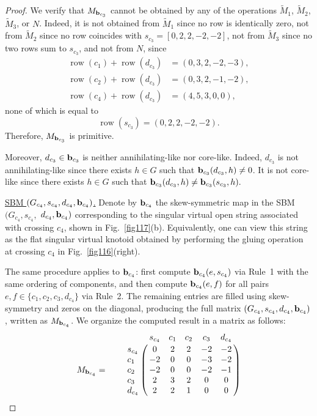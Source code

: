 \documentclass[12pt]{amsart}
\theoremstyle{noparens}
\numberwithin{equation}{section}
\numberwithin{equation}{section}
\begin{document}
\begin{proof}
	We verify that $M_{{\bf b}_{c_3}}$ cannot be obtained by any of the operations $\widetilde{M}_1$, $\widetilde{M}_2$, $\widetilde{M}_3$, or $N$. Indeed, it is not obtained from $\widetilde{M}_1$ since no row is identically zero, not from $\widetilde{M}_2$ since no row coincides with $s_{c_3} = [0, 2, 2, -2, -2]$, not from $\widetilde{M}_3$ since no two rows sum to $s_{c_3}$, and not from $N$, since
	\[
	\begin{aligned}
		\operatorname{row}(c_1)+\operatorname{row}(d_{c_3})
		&=(0,3,2,-2,-3),\\
		\operatorname{row}(c_2)+\operatorname{row}(d_{c_3})
		&=(0,3,2,-1,-2),\\
		\operatorname{row}(c_4)+\operatorname{row}(d_{c_3})
		&=(4,5,3,0,0),
	\end{aligned}
	\]
	none of which is equal to
	\[
	\operatorname{row}(s_{c_3})=(0,2,2,-2,-2).
	\]
	Therefore, $M_{{\bf b}_{c_3}}$ is primitive.
	
	Moreover, $d_{c_3} \in {\bf b}_{c_3}$ is neither annihilating-like nor core-like. Indeed, $d_{c_3}$ is not annihilating-like since there exists $h \in G$ such that ${\bf b}_{c_3}(d_{c_3},h) \neq 0$. It is not core-like since there exists $h \in G$ such that ${\bf b}_{c_3}(d_{c_3},h) \neq {\bf b}_{c_3}(s_{c_3},h).$
	
	\underline{SBM $(G_{c_4}, s_{c_4}, d_{c_4}, {\bf b}_{c_4})$.}
	Denote by ${\bf b}_{c_4}$ the skew-symmetric map in the SBM $(G_{c_4}, s_{c_4}, $ $d_{c_4},{\bf b}_{c_4})$ corresponding to the singular virtual open string associated with crossing $c_4$, shown in Fig.~\ref{fig117}(b). Equivalently, one can view this string as the flat singular virtual knotoid obtained by performing the gluing operation at crossing $c_4$ in Fig.~\ref{fig116}(right).
	
	The same procedure applies to ${\bf b}_{c_4}$: first compute ${\bf b}_{c_4}(e,s_{c_4})$ via Rule~1 with the same ordering of components, and then compute ${\bf b}_{c_4}(e,f)$ for all pairs $e,f \in \{c_1,c_2,c_3,d_{c_4}\}$ via Rule~2. The remaining entries are filled using skew-symmetry and zeros on the diagonal, producing the full matrix $(G_{c_4}, s_{c_4}, d_{c_4}, {\bf b}_{c_4})$, written as $M_{{\bf b}_{c_4}}$. We organize the computed result in a matrix as follows: 
	$$	
	M_{{\bf b}_{c_4}} = \qquad \bordermatrix{
		&     s_{c_4} &  c_1 & c_2 & c_3 & d_{c_4}  \cr
		s_{c_4}   & 0 &  2 & 2 &-2 &-2  \cr
		c_1   &-2 &  0 & 0 &-3 &-2  \cr
		c_2   &-2 &  0 & 0 &-2 &-1  \cr
		c_3   & 2 &  3 & 2 & 0 & 0  \cr
		d_{c_4}  & 2 &  2 & 1 & 0 & 0  \cr	 
	} 
	$$	
	

\end{proof}
\end{document}
